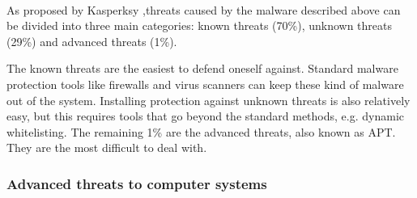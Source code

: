 ~~\\
As proposed by Kasperksy \cite{APTKaspersky} ,threats caused by the malware described above can be divided into three main categories: known threats (70\%), unknown threats (29\%) and advanced threats (1\%). 

The known threats are the easiest to defend oneself against. Standard malware protection tools like firewalls and virus scanners can keep these kind of malware out of the system. Installing protection against unknown threats is also relatively easy, but this requires tools that go beyond the standard methods, e.g. dynamic whitelisting. The remaining 1\% are the advanced threats, also known as APT. They are the most difficult to deal with.

\subsubsection{Advanced threats to computer systems}

